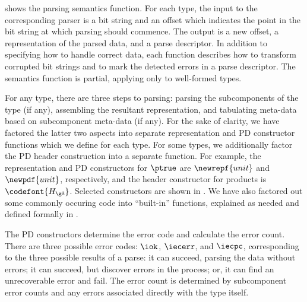  shows the parsing semantics function.
For each type,
the input to the corresponding parser is a bit string and an offset which indicates the point in the bit string at which parsing should commence.  The output
is a new offset, a representation of the parsed data, and a parse descriptor.
In addition to specifying how to handle correct data, each function describes how to transform corrupted bit strings and to mark the detected errors in a parse descriptor. The semantics function is partial, applying only
to well-formed \ddc{} types.

For any type, there are three steps to parsing: parsing the
subcomponents of the type (if any), assembling the resultant representation, and
tabulating meta-data based on subcomponent meta-data
(if any). For the sake of clarity, we have factored the latter two
aspects into separate representation and PD constructor functions which we define for
each type. For some types, we additionally factor the PD header
construction into a separate function. For example, the representation 
and PD constructors for $\ptrue$ are $\newrepf {unit}$ and $\newpdf
{unit}$, respectively, and the header constructor for products is
${\codefont{H_{\gS}}}$. Selected constructors are shown in
. We have also factored out some commonly
occuring code into ``built-in'' functions, explained as needed and
defined formally in .

The PD constructors determine the error code and
calculate the error count.  There are three possible error codes:
$\iok$, $\iecerr$, and $\iecpc$, corresponding to the three possible results of a parse: 
it can succeed, parsing the data without errors; it can succeed,
but discover errors in the process; or, it can find an
unrecoverable error and fail.
The error count is determined by subcomponent error counts and any errors associated directly with the type
itself.  

